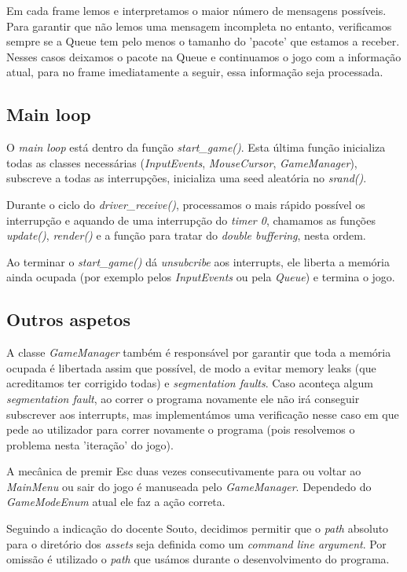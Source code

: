 \documentclass{report}
\begin{document}
Em cada frame lemos e interpretamos o maior número de mensagens possíveis. Para garantir que não lemos uma mensagem incompleta no entanto, verificamos sempre se a Queue tem pelo menos o tamanho do 'pacote' que estamos a receber. Nesses casos deixamos o pacote na Queue e continuamos o jogo com a informação atual, para no frame imediatamente a seguir, essa informação seja processada.

\subsection{Main loop}

O \textit{main loop} está dentro da função \textit{start\_game()}. Esta última função inicializa todas as classes necessárias (\textit{InputEvents}, \textit{MouseCursor}, \textit{GameManager}), subscreve a todas as interrupções, inicializa uma seed aleatória no \textit{srand()}.

Durante o ciclo do \textit{driver\_receive()}, processamos o mais rápido possível os interrupção e aquando de uma interrupção do \textit{timer 0}, chamamos as funções \textit{update()}, \textit{render()} e a função para tratar do \textit{double buffering}, nesta ordem.

Ao terminar o \textit{start\_game()} dá \textit{unsubcribe} aos interrupts, ele liberta a memória ainda ocupada (por exemplo pelos \textit{InputEvents} ou pela \textit{Queue}) e termina o jogo.

\subsection{Outros aspetos}

A classe \textit{GameManager} também é responsável por garantir que toda a memória ocupada é libertada assim que possível, de modo a evitar memory leaks (que acreditamos ter corrigido todas) e \textit{segmentation faults}. Caso aconteça algum \textit{segmentation fault}, ao correr o programa novamente ele não irá conseguir subscrever aos interrupts, mas implementámos uma verificação nesse caso em que pede ao utilizador para correr novamente o programa (pois resolvemos o problema nesta 'iteração' do jogo).

A mecânica de premir Esc duas vezes consecutivamente para ou voltar ao \textit{MainMenu} ou sair do jogo é manuseada pelo \textit{GameManager}. Dependedo do \textit{GameModeEnum} atual ele faz a ação correta.

Seguindo a indicação do docente Souto, decidimos permitir que o \textit{path} absoluto para o diretório dos \textit{assets} seja definida como um \textit{command line argument}. Por omissão é utilizado o \textit{path} que usámos durante o desenvolvimento do programa.
\end{document}
